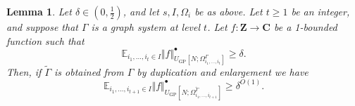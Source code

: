 \documentclass[11pt,reqno]{amsart}
\numberwithin{equation}{section}
\newtheorem{lemma}[theorem]{Lemma}
\theoremstyle{definition}
\theoremstyle{remark}
\newcommand{\mb}{\mathbb}
\renewcommand{\ge}{\geqslant}
\newcommand\Z{\mathbf{Z}}
\newcommand\C{\mathbf{C}}
\newcommand\E{\mb{E}}
\newcommand\GP{\operatorname{GP}}
\begin{document}
\begin{lemma}
Let $\delta \in (0, \frac{1}{2})$, and let $s, I, \Omega_i$ be as above. Let $t \ge 1$ be an integer, and suppose that $\Gamma$ is a graph system at level $t$. Let $f : \Z \rightarrow \C$ be a 1-bounded function such that 
\begin{equation}\label{iter-step-t} \E_{i_1,\dots, i_t \in I} \Vert f \Vert^{\bullet}_{U_{\GP}[N; \Omega^{\Gamma}_{i_1,\dots, i_t}]} \ge \delta. \end{equation}
Then, if $\tilde \Gamma$ is obtained from $\Gamma$ by duplication and enlargement we have 
\begin{equation}\label{iter-step-t1} \E_{i_1,\dots, i_{t+1} \in I} \Vert f \Vert^{\bullet}_{U_{\GP}[N; \Omega^{\tilde\Gamma}_{i_1,\dots, i_{t+1}}]} \ge \delta^{O(1)}. \end{equation}
\end{lemma}
\end{document}
